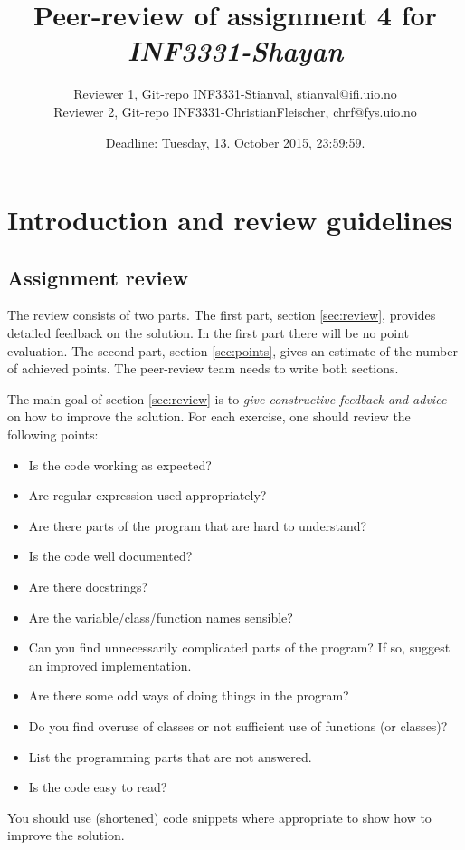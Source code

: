 \documentclass[a4paper]{article}
\title{Peer-review of assignment 4 for \textit{INF3331-Shayan}}
\author{Reviewer 1, Git-repo INF3331-Stianval, {stianval@ifi.uio.no} \\
		Reviewer 2, Git-repo INF3331-ChristianFleischer, {chrf@fys.uio.no}}
\date{Deadline: Tuesday, 13. October 2015, 23:59:59.}
\begin{document}
\maketitle

\section{Introduction and review guidelines}





\subsection{Assignment review}\label{sec:general_review}

The review consists of two parts. The first part, section \ref{sec:review}, provides detailed feedback on the solution. In the first part there will be no point evaluation. The second part, section \ref{sec:points}, gives an estimate of the number of achieved points. The peer-review team needs to write both sections.

The main goal of section \ref{sec:review} is to \emph{give constructive feedback and advice} on how to improve the solution. For each exercise, one should review the following points:

\begin{itemize}
  \item Is the code working as expected? 
  \item Are regular expression used appropriately?  
  \item Are there parts of the program that are hard to understand?   
  \item Is the code well documented?
  \item Are there docstrings?
  \item Are the variable/class/function names sensible?
  \item Can you find unnecessarily complicated parts of the program? If so, suggest an improved implementation.
  \item Are there some odd ways of doing things in the program?
  \item Do you find overuse of classes or not sufficient use of functions (or
    classes)?
  \item List the programming parts that are not answered.    
  \item Is the code easy to read?
\end{itemize}
You should use (shortened) code snippets where appropriate to show how to improve the solution. 
\end{document}
